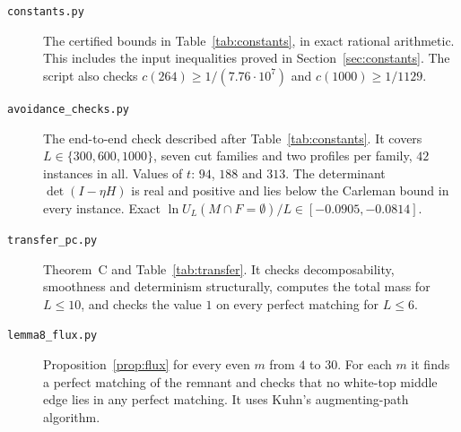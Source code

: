 \begin{description}
\item[\texttt{constants.py}] The certified bounds in Table~\ref{tab:constants}, in exact rational arithmetic. This includes the input inequalities proved in Section~\ref{sec:constants}. The script also checks $c(264)\ge1/(7.76\cdot10^7)$ and $c(1000)\ge1/1129$.

\item[\texttt{avoidance\_checks.py}] The end-to-end check described after Table~\ref{tab:constants}. It covers $L\in\{300,600,1000\}$, seven cut families and two profiles per family, $42$ instances in all. Values of $t$: $94$, $188$ and $313$. The determinant $\det(I-\eta H)$ is real and positive and lies below the Carleman bound in every instance. Exact $\ln U_L(M\cap F=\emptyset)/L\in[-0.0905,-0.0814]$.

\item[\texttt{transfer\_pc.py}] Theorem~C and Table~\ref{tab:transfer}. It checks decomposability, smoothness and determinism structurally, computes the total mass for $L\le10$, and checks the value $1$ on every perfect matching for $L\le6$.

\item[\texttt{lemma8\_flux.py}] Proposition~\ref{prop:flux} for every even $m$ from $4$ to $30$. For each $m$ it finds a perfect matching of the remnant and checks that no white-top middle edge lies in any perfect matching. It uses Kuhn's augmenting-path algorithm.
\end{description}


